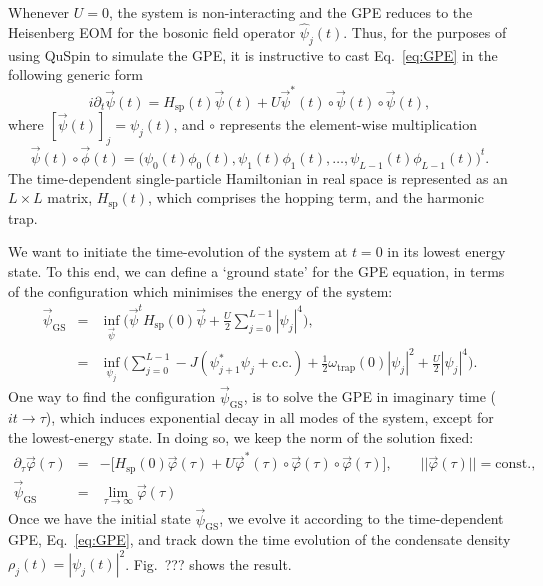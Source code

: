 \documentclass{SciPost}
\newcommand\0{\scalebox{-1}[1]{0}}
\begin{document}
Whenever $U=0$, the system is non-interacting and the GPE reduces to the Heisenberg EOM for the bosonic field operator $\hat\psi_j(t)$. Thus, for the purposes of using QuSpin to simulate the GPE, it is instructive to cast Eq.~\eqref{eq:GPE} in the following generic form
\begin{equation}
i\partial_t\vec{\psi}(t) = H_\mathrm{sp}(t)\vec{\psi}(t) + U \vec{\psi}^*(t)\circ \vec{\psi}(t)\circ \vec{\psi}(t), 
\end{equation}  
where $[\vec{\psi}(t)]_j = \psi_j(t)$, and $\circ$ represents the element-wise multiplication 
\begin{equation*}
\vec{\psi}(t)\circ \vec{\phi}(t) = \bigg(\psi_0(t)\phi_0(t), \psi_1(t)\phi_1(t),\dots, \psi_{L-1}(t)\phi_{L-1}(t) \bigg)^t.
\end{equation*}
The time-dependent single-particle Hamiltonian in real space is represented as an $L\times L$ matrix, $H_\mathrm{sp}(t)$, which comprises the hopping term, and the harmonic trap.

We want to initiate the time-evolution of the system at $t=0$ in its lowest energy state. To this end, we can define a `ground state' for the GPE equation, in terms of the configuration which minimises the energy of the system:
\begin{eqnarray}
\vec\psi_\mathrm{GS} &=& \inf_{\vec{\psi}} \bigg( \vec{\psi}^t H_\mathrm{sp}(0)\vec{\psi} + \frac{U}{2}\sum_{j=0}^{L-1}|\psi_j|^4\bigg),\nonumber\\
&=&\inf_{\psi_j} \bigg(\sum_{j=0}^{L-1} -J(\psi_{j+1}^*\psi_j + \mathrm{c.c.}) + \frac{1}{2}\omega_\mathrm{trap}(0)|\psi_j|^2 + \frac{U}{2}|\psi_j|^4\bigg).
\end{eqnarray} 
One way to find the configuration $\vec\psi_\mathrm{GS}$, is to solve the GPE in imaginary time ($it\to \tau$), which induces exponential decay in all modes of the system, except for the lowest-energy state. In doing so, we keep the norm of the solution fixed:
\begin{eqnarray}
\partial_{\tau}\vec\varphi(\tau) &=& -\bigg[H_\mathrm{sp}(0)\vec\varphi(\tau) + U \vec\varphi^*(\tau)\circ \vec\varphi(\tau)\circ \vec\varphi(\tau)\bigg],\qquad ||\vec\varphi(\tau)||=\mathrm{const.},\nonumber\\
\vec{\psi}_\mathrm{GS} &=& \lim_{\tau\to\infty}\vec\varphi(\tau)
\end{eqnarray}
Once we have the initial state $\vec\psi_\mathrm{GS}$, we evolve it according to the time-dependent GPE, Eq.~\eqref{eq:GPE}, and track down the time evolution of the condensate density $\rho_j(t)=|\psi_j(t)|^2$. Fig.~??? shows the result.
\end{document}

